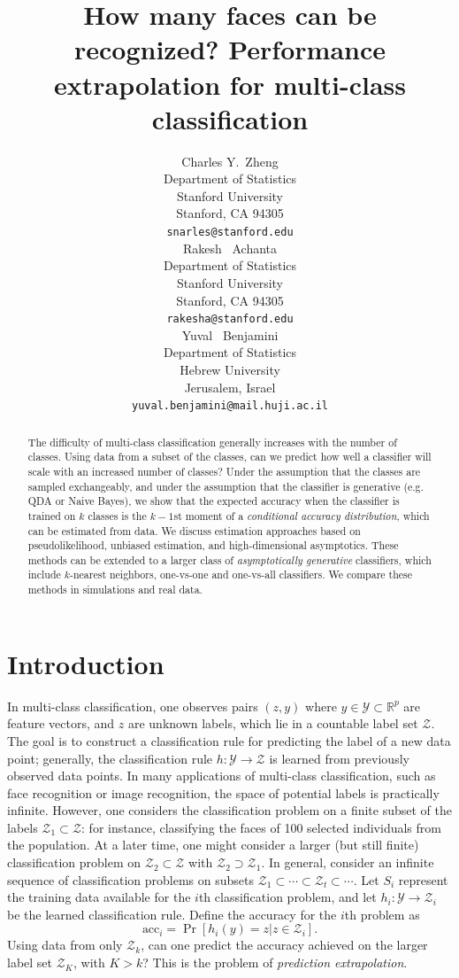 \documentclass{article}
\title{How many faces can be recognized? Performance extrapolation for
  multi-class classification}
\author{
  Charles Y.~Zheng \\
  Department of Statistics\\
  Stanford University\\
  Stanford, CA 94305 \\
  \texttt{snarles@stanford.edu} \\
  \And
  Rakesh ~Achanta \\
  Department of Statistics\\
  Stanford University\\
  Stanford, CA 94305 \\
  \texttt{rakesha@stanford.edu} \\
  \And
  Yuval ~Benjamini \\
  Department of Statistics \\
  Hebrew University\\
  Jerusalem, Israel\\
  \texttt{yuval.benjamini@mail.huji.ac.il}
}
\begin{document}

\maketitle

\begin{abstract}
The difficulty of multi-class classification generally increases with
the number of classes.  Using data from a subset of the classes, 
can we predict how well a classifier will scale with an
increased number of classes?  Under the assumption that the classes
are sampled exchangeably, and under the assumption that
the classifier is generative (e.g. QDA or Naive Bayes), we show that the expected accuracy
when the classifier is trained on $k$ classes is the $k-1$st moment
of a \emph{conditional accuracy distribution}, which can be estimated from data.
We discuss estimation approaches based on pseudolikelihood, 
unbiased estimation, and high-dimensional asymptotics.
These methods can be extended to a larger class of \emph{asymptotically generative} classifiers,
which include $k$-nearest neighbors, one-vs-one and
one-vs-all classifiers.
We compare these methods in simulations and real data.
\end{abstract}

\section{Introduction}

In multi-class classification, one observes pairs $(z, y)$ where $y \in \mathcal{Y} \subset \mathbb{R}^p$ are feature vectors,
and $z$ are unknown labels, which lie in a countable label set $\mathcal{Z}$.  The goal is to construct a classification rule for
predicting the label of a new data point; generally, the classification rule $h: \mathcal{Y} \to \mathcal{Z}$
is learned from previously observed data points.  In many applications of multi-class classification,
such as face recognition or image recognition, the space of potential labels is practically infinite.
However, one considers the classification problem on a finite subset of the labels $\mathcal{Z}_1 \subset \mathcal{Z}$:
for instance, classifying the faces of 100 selected individuals from the population.
At a later time, one might consider a larger (but still finite) classification problem on $\mathcal{Z}_2 \subset \mathcal{Z}$
with $\mathcal{Z}_2 \supset \mathcal{Z}_1$.
In general, consider an infinite sequence of classification problems on subsets $\mathcal{Z}_1 \subset \cdots \subset \mathcal{Z}_t \subset \cdots$.  
Let $S_i$ represent the training data available for the $i$th classification problem,
and let $h_i: \mathcal{Y} \to \mathcal{Z}_i$ be the learned classification rule.
Define the accuracy for the $i$th problem as
\[
\text{acc}_i = \Pr[h_i(y) = z|z \in \mathcal{Z}_i].
\]
Using data from only $\mathcal{Z}_k$, can one predict the accuracy achieved on the larger label set $\mathcal{Z}_K$, with $K> k$?  This is the problem of \emph{prediction extrapolation}.
\end{document}
